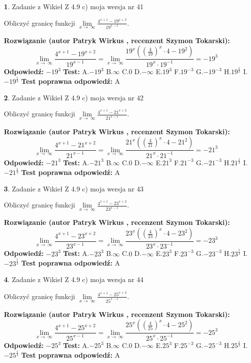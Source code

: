 \documentclass[12pt, a4paper]{article}
\theoremstyle{definition} %
\newtheorem{zad}{}
\newcommand{\zadStart}[1]{\begin{zad}#1\newline}
\newcommand{\zadStop}{\end{zad}}
\newcommand{\rozwStart}[2]{\noindent \textbf{Rozwiązanie (autor #1 , recenzent #2): }\newline}
\newcommand{\rozwStop}{\newline}
\newcommand{\odpStart}{\noindent \textbf{Odpowiedź:}\newline}
\newcommand{\odpStop}{\newline}
\newcommand{\testStart}{\noindent \textbf{Test:}\newline}
\newcommand{\testStop}{\newline}
\newcommand{\kluczStart}{\noindent \textbf{Test poprawna odpowiedź:}\newline}
\newcommand{\kluczStop}{\newline}
\begin{document}
\zadStart{Zadanie z Wikieł Z 4.9 c) moja wersja nr 41}


Obliczyć granicę funkcji  $\lim\limits_{x\to\ \infty}\frac{4^{x+1}-19^{x+2}}{19^{x-1}}$.
\zadStop
\rozwStart{Patryk Wirkus}{Szymon Tokarski}
$$\lim\limits_{x\to\ \infty}\frac{4^{x+1}-19^{x+2}}{19^{x-1}}=\lim\limits_{x\to\ \infty}\frac{19^{x}((\frac{4}{19})^{x}\cdot 4 -19^{2})}{19^{x}\cdot 19^{-1}} = -19^{3}$$
\rozwStop
\odpStart
$-19^{3}$
\odpStop
\testStart
A.$-19^{3}$ B.$\infty$ C.$0$ D.$-\infty$ E.$19^{3}$
F.$19^{-3}$ G.$-19^{-3}$
H.$19^{\frac{1}{3}}$
I.$-19^{\frac{1}{3}}$
\testStop
\kluczStart
A
\kluczStop



\zadStart{Zadanie z Wikieł Z 4.9 c) moja wersja nr 42}


Obliczyć granicę funkcji  $\lim\limits_{x\to\ \infty}\frac{4^{x+1}-21^{x+2}}{21^{x-1}}$.
\zadStop
\rozwStart{Patryk Wirkus}{Szymon Tokarski}
$$\lim\limits_{x\to\ \infty}\frac{4^{x+1}-21^{x+2}}{21^{x-1}}=\lim\limits_{x\to\ \infty}\frac{21^{x}((\frac{4}{21})^{x}\cdot 4 -21^{2})}{21^{x}\cdot 21^{-1}} = -21^{3}$$
\rozwStop
\odpStart
$-21^{3}$
\odpStop
\testStart
A.$-21^{3}$ B.$\infty$ C.$0$ D.$-\infty$ E.$21^{3}$
F.$21^{-3}$ G.$-21^{-3}$
H.$21^{\frac{1}{3}}$
I.$-21^{\frac{1}{3}}$
\testStop
\kluczStart
A
\kluczStop



\zadStart{Zadanie z Wikieł Z 4.9 c) moja wersja nr 43}


Obliczyć granicę funkcji  $\lim\limits_{x\to\ \infty}\frac{4^{x+1}-23^{x+2}}{23^{x-1}}$.
\zadStop
\rozwStart{Patryk Wirkus}{Szymon Tokarski}
$$\lim\limits_{x\to\ \infty}\frac{4^{x+1}-23^{x+2}}{23^{x-1}}=\lim\limits_{x\to\ \infty}\frac{23^{x}((\frac{4}{23})^{x}\cdot 4 -23^{2})}{23^{x}\cdot 23^{-1}} = -23^{3}$$
\rozwStop
\odpStart
$-23^{3}$
\odpStop
\testStart
A.$-23^{3}$ B.$\infty$ C.$0$ D.$-\infty$ E.$23^{3}$
F.$23^{-3}$ G.$-23^{-3}$
H.$23^{\frac{1}{3}}$
I.$-23^{\frac{1}{3}}$
\testStop
\kluczStart
A
\kluczStop



\zadStart{Zadanie z Wikieł Z 4.9 c) moja wersja nr 44}


Obliczyć granicę funkcji  $\lim\limits_{x\to\ \infty}\frac{4^{x+1}-25^{x+2}}{25^{x-1}}$.
\zadStop
\rozwStart{Patryk Wirkus}{Szymon Tokarski}
$$\lim\limits_{x\to\ \infty}\frac{4^{x+1}-25^{x+2}}{25^{x-1}}=\lim\limits_{x\to\ \infty}\frac{25^{x}((\frac{4}{25})^{x}\cdot 4 -25^{2})}{25^{x}\cdot 25^{-1}} = -25^{3}$$
\rozwStop
\odpStart
$-25^{3}$
\odpStop
\testStart
A.$-25^{3}$ B.$\infty$ C.$0$ D.$-\infty$ E.$25^{3}$
F.$25^{-3}$ G.$-25^{-3}$
H.$25^{\frac{1}{3}}$
I.$-25^{\frac{1}{3}}$
\testStop
\kluczStart
A
\kluczStop
\end{document}
